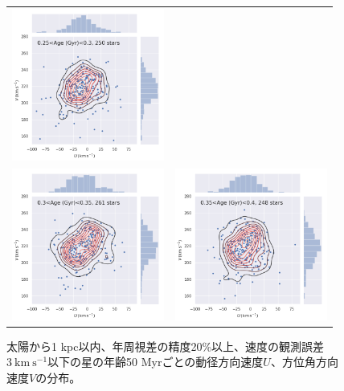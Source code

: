 \begin{figure}[htbp]
\begin{tabular}{cc}
\includegraphics[width=5cm]{fig/UV/250to300Myr_z0.1kpc_hist2d.png}\\
\includegraphics[width=5cm]{fig/UV/300to350Myr_z0.1kpc_hist2d.png}&
\includegraphics[width=5cm]{fig/UV/350to400Myr_z0.1kpc_hist2d.png}\\
\end{tabular}
    \caption{太陽から1 kpc以内、年周視差の精度20\%以上、速度の観測誤差$3\ \mathrm{km\ s^{-1}}$以下の星の年齢50 Myrごとの動径方向速度$U$、方位角方向速度$V$の分布。}
    \label{hist_UV_50Myr}
\end{figure}

